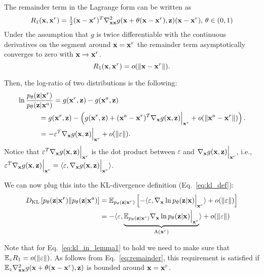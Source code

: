The remainder term in the Lagrange form can be written as
\begin{equation}\label{eq:remainder}
    R_1(\rvx, \rvx^r) = \tfrac{1}{2}(\rvx - \rvx^r)^T \nabla^2_{\rvx\rvx} g(\rvx + \theta (\rvx - \rvx^r), \rvz) (\rvx - \rvx^r), \, \theta \in (0, 1)
\end{equation}
Under the assumption that $g$ is twice differentiable with the continuous derivatives on the segment around ${\mathbf{x}} = {\mathbf{x}}^r$ the remainder term asymptotically converges to zero with ${\mathbf{x}} \rightarrow {\mathbf{x}}^r$. 
\begin{equation}
    R_1({\mathbf{x}}, {\mathbf{x}}^r) = o(\|{\mathbf{x}} - {\mathbf{x}}^r\|).
\end{equation}

Then, the log-ratio of two distributions is the following:
\begin{align}
    &\ln \frac{p_{\theta}({\mathbf{z}}| {\mathbf{x}}^r)}{p_{\theta}({\mathbf{z}}|{\mathbf{x}}^a)}
    = g({\mathbf{x}}^r, {\mathbf{z}}) - g({\mathbf{x}}^a, {\mathbf{z}}) \\
    &\quad\quad\quad = g({\mathbf{x}}^r, {\mathbf{z}}) - \left( g({\mathbf{x}}^r, {\mathbf{z}}) + ({\mathbf{x}}^a - {\mathbf{x}}^r)^T \nabla_{{\mathbf{x}}} g({\mathbf{x}}, {\mathbf{z}}) \Big|_{{\mathbf{x}}^r} + o(\|{\mathbf{x}}^a - {\mathbf{x}}^r\|)\right). \\
    &\quad\quad\quad =  -\varepsilon^T\nabla_{{\mathbf{x}}} g({\mathbf{x}}, {\mathbf{z}}) \Big|_{{\mathbf{x}}^r} + o(\|\varepsilon\|) .
\end{align}
Notice that $\varepsilon^T \nabla_{{\mathbf{x}}} g({\mathbf{x}}, {\mathbf{z}}) \Big|_{{\mathbf{x}}^r} $ is the dot product between $\varepsilon$ and $\nabla_{{\mathbf{x}}} g({\mathbf{x}}, {\mathbf{z}}) \Big|_{{\mathbf{x}}^r} $, i.e., $\varepsilon^T \nabla_{{\mathbf{x}}} g({\mathbf{x}}, {\mathbf{z}}) \Big|_{{\mathbf{x}}^r}  = \langle \varepsilon, \nabla_{{\mathbf{x}}} g({\mathbf{x}}, {\mathbf{z}}) \Big|_{{\mathbf{x}}^r}  \rangle$.

We can now plug this into the KL-divergence definition (Eq.~\ref{eq:kl_def}):
\begin{align}
     \KL{p_{\theta}(\rvz|\rvx^r)}{p_{\theta}(\rvz|\rvx^a)} &= \E_{p_{\theta}(\rvz|\rvx^r)} \left[ -\langle \varepsilon, \nabla_{\rvx} \ln p_{\theta}(\rvz|\rvx) \Big|_{\rvx^r}  \rangle + o(\|\varepsilon\|)\right] \\
     &=   -\langle \varepsilon, \underbrace{ \E_{p_{\theta}(\rvz|\rvx^r)}  \nabla_{\rvx} \ln p_{\theta}(\rvz|\rvx) \Big|_{\rvx^r}}_{\text{A}(\rvx^r)}  \rangle + o(\|\varepsilon\|) \label{eq:kl_in_lemma1}
\end{align}

Note that for Eq.~\ref{eq:kl_in_lemma1} to hold we need to make sure that $\mathbb{E}_z R_1 = o(\|\varepsilon\|)$. As follows from Eq.~\ref{eq:remainder}, this requirement is satisfied if $\mathbb{E}_{z}\nabla^2_{{\mathbf{x}}{\mathbf{x}}} g({\mathbf{x}} + \theta ({\mathbf{x}} - {\mathbf{x}}^r), {\mathbf{z}})$ is bounded around ${\mathbf{x}} = {\mathbf{x}}^r$.


